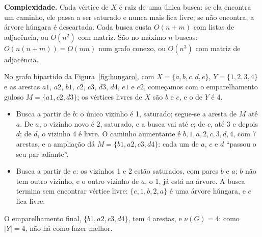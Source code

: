 \textbf{Complexidade.} Cada vértice de $X$ é raiz de uma única busca: se ela encontra um caminho, ele passa a ser saturado e nunca mais fica livre; se não encontra, a árvore húngara é descartada. Cada busca custa $O(n+m)$ com listas de adjacência, ou $O(n^2)$ com matriz. São no máximo $n$ buscas: $O(n(n+m))=O(nm)$ num grafo conexo, ou $O(n^3)$ com matriz de adjacência.

\begin{exemplo}\label{ex:hungaro}
No grafo bipartido da Figura~\ref{fig:hungaro}, com $X=\{a,b,c,d,e\}$, $Y=\{1,2,3,4\}$ e as arestas $a1$, $a2$, $b1$, $c2$, $c3$, $d3$, $d4$, $e1$ e $e2$, começamos com o emparelhamento guloso $M=\{a1,c2,d3\}$; os vértices livres de $X$ são $b$ e $e$, e o de $Y$ é 4.
\begin{itemize}
  \item Busca a partir de $b$: o único vizinho é 1, saturado; segue-se a aresta de $M$ até $a$. De $a$, o vizinho novo é 2, saturado, e a busca vai até $c$; de $c$, até 3 e depois $d$; de $d$, o vizinho 4 é livre. O caminho aumentante é $b,1,a,2,c,3,d,4$, com 7 arestas, e a ampliação dá $M=\{b1,a2,c3,d4\}$: cada um de $a$, $c$ e $d$ ``passou o seu par adiante''.
  \item Busca a partir de $e$: os vizinhos 1 e 2 estão saturados, com pares $b$ e $a$; $b$ não tem outro vizinho, e o outro vizinho de $a$, o 1, já está na árvore. A busca termina sem encontrar vértice livre: $\{e,1,b,2,a\}$ é uma árvore húngara, e $e$ fica livre.
\end{itemize}
O emparelhamento final, $\{b1,a2,c3,d4\}$, tem 4 arestas, e $\nu(G)=4$: como $|Y|=4$, não há como fazer melhor.
\begin{figura}
\end{figura}
\end{exemplo}

